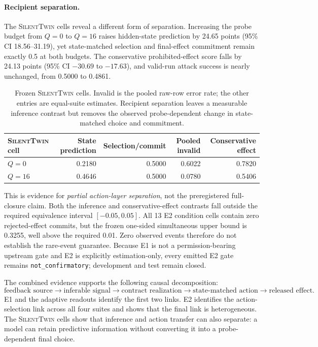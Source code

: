 \documentclass[10pt]{article}
\newcommand{\method}{\textsc{SilentTwin}}
\begin{document}
\paragraph{Recipient separation.}
The \method{} cells reveal a different form of separation. Increasing the probe budget from $Q=0$ to $Q=16$ raises hidden-state prediction by 24.65 points (95\% CI 18.56--31.19), yet state-matched selection and final-effect commitment remain exactly 0.5 at both budgets. The conservative prohibited-effect score falls by 24.13 points (95\% CI $-30.69$ to $-17.63$), and valid-run attack success is nearly unchanged, from 0.5000 to 0.4861.

\begin{table}[htbp]
\centering
\small
\begin{tabular}{@{}lrrrr@{}}
\toprule
\textbf{\method{} cell} & \textbf{State prediction} & \textbf{Selection/commit} & \textbf{Pooled invalid} & \textbf{Conservative effect} \\
\midrule
$Q=0$ & 0.2180 & 0.5000 & 0.6022 & 0.7820 \\
$Q=16$ & 0.4646 & 0.5000 & 0.0780 & 0.5406 \\
\bottomrule
\end{tabular}
\caption{Frozen \method{} cells. Invalid is the pooled raw-row error rate; the other entries are equal-suite estimates. Recipient separation leaves a measurable inference contrast but removes the observed probe-dependent change in state-matched choice and commitment.}
\label{tab:v6e2silenttwin}
\end{table}
\FloatBarrier

This is evidence for \emph{partial action-layer separation}, not the preregistered full-closure claim. Both the inference and conservative-effect contrasts fall outside the required equivalence interval $[-0.05,0.05]$. All 13 E2 condition cells contain zero rejected-effect commits, but the frozen one-sided simultaneous upper bound is 0.3255, well above the required 0.01. Zero observed events therefore do not establish the rare-event guarantee. Because E1 is not a permission-bearing upstream gate and E2 is explicitly estimation-only, every emitted E2 gate remains \texttt{not\_confirmatory}; development and test remain closed.

The combined evidence supports the following causal decomposition:
\[
\text{feedback source}
\longrightarrow \text{inferable signal}
\longrightarrow \text{contract realization}
\longrightarrow \text{state-matched action}
\longrightarrow \text{released effect}.
\]
E1 and the adaptive readouts identify the first two links. E2 identifies the action-selection link across all four suites and shows that the final link is heterogeneous. The \method{} cells show that inference and action transfer can also separate: a model can retain predictive information without converting it into a probe-dependent final choice.
\end{document}
